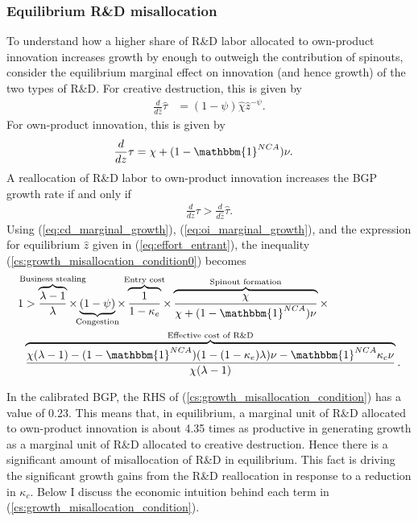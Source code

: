 \documentclass[11pt,english]{article}
\theoremstyle{definition}
\begin{document}
\subsubsection{Equilibrium R\&D misallocation}

To understand how a higher share of R\&D labor allocated to own-product innovation increases growth by enough to outweigh the contribution of spinouts, consider the equilibrium marginal effect on innovation (and hence growth) of the two types of R\&D. For creative destruction, this is given by
\begin{align}
	\frac{d}{d\hat{z}} \hat{\tau} &= (1-\psi) \hat{\chi} \hat{z}^{-\psi}. \label{eq:cd_marginal_growth}
\end{align}
For own-product innovation, this is given by 
\begin{align}
	\frac{d}{dz} \tau &= \chi + (1-\mathbbm{1}^{NCA}) \nu. \label{eq:oi_marginal_growth}
\end{align}
A reallocation of R\&D labor to own-product innovation increases the BGP growth rate if and only if
\begin{align}
	\frac{d}{dz} \tau > \frac{d}{d\hat{z}} \hat{\tau}. \label{cs:growth_misallocation_condition0}
\end{align}
Using (\ref{eq:cd_marginal_growth}), (\ref{eq:oi_marginal_growth}), and the expression for equilibrium $\hat{z}$ given in (\ref{eq:effort_entrant}), the inequality (\ref{cs:growth_misallocation_condition0}) becomes
\begin{align}
	1 &> \overbrace{\frac{\lambda-1}{\lambda}}^{\mathclap{\text{Business stealing}}} \times \underbrace{(1-\psi)}_{\mathclap{\text{Congestion}}}   \times \overbrace{\frac{1}{1-\kappa_{e}}}^{\mathclap{\text{Entry cost}}} \times \overbrace{\frac{\chi}{\chi + (1-\mathbbm{1}^{NCA})\nu}}^{\mathclap{\text{Spinout formation}}} \times \nonumber \\ 
	&\overbrace{\frac{\chi(\lambda-1) -(1-\mathbbm{1}^{NCA}) (1-(1-\kappa_e)\lambda)\nu - \mathbbm{1}^{NCA} \kappa_c \nu}{\chi(\lambda-1)}}^{\mathclap{\text{Effective cost of R\&D}}}. \label{cs:growth_misallocation_condition} 
\end{align}

In the calibrated BGP, the RHS of (\ref{cs:growth_misallocation_condition}) has a value of 0.23. This means that, in equilibrium, a marginal unit of R\&D allocated to own-product innovation is about 4.35 times as productive in generating growth as a marginal unit of R\&D allocated to creative destruction. Hence there is a significant amount of misallocation of R\&D in equilibrium. This fact is driving the significant growth gains from the R\&D reallocation in response to a reduction in $\kappa_c$. Below I discuss the economic intuition behind each term in (\ref{cs:growth_misallocation_condition}).
\end{document}
